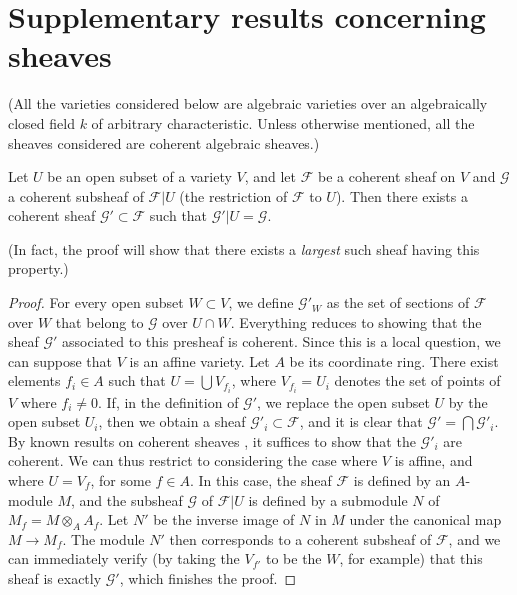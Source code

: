 \documentclass{article}
\theoremstyle{plain}
\newenvironment{proposition}[1]
    {\renewcommand\theinnerproposition{#1}\innerproposition}
    {\endinnerproposition}
\theoremstyle{definition}
\newcommand{\scr}[1]{{\mathscr{#1}}}
\newcommand{\oldpage}[1]{\marginpar{\footnotesize$\Big\vert$ \textit{p.~#1}}}
\begin{document}
\section{Supplementary results concerning sheaves}
\label{section1}

(All the varieties considered below are algebraic varieties over an algebraically closed field $k$ of arbitrary characteristic. Unless otherwise mentioned, all the sheaves considered are coherent algebraic sheaves.)

\begin{proposition}{1}
\label{proposition1}
\oldpage{98}
  Let $U$ be an open subset of a variety $V$, and let $\scr{F}$ be a coherent sheaf on $V$ and $\scr{G}$ a coherent subsheaf of $\scr{F}|U$ (the restriction of $\scr{F}$ to $U$).
  Then there exists a coherent sheaf $\scr{G}'\subset\scr{F}$ such that $\scr{G}'|U=\scr{G}$.
\end{proposition}

(In fact, the proof will show that there exists a \emph{largest} such sheaf having this property.)

\begin{proof}
  For every open subset $W\subset V$, we define $\scr{G}'_W$ as the set of sections of $\scr{F}$ over $W$ that belong to $\scr{G}$ over $U\cap W$.
  Everything reduces to showing that the sheaf $\scr{G}'$ associated to this presheaf is coherent.
  Since this is a local question, we can suppose that $V$ is an affine variety.
  Let $A$ be its coordinate ring.
  There exist elements $f_i\in A$ such that $U=\bigcup V_{f_i}$, where $V_{f_i}=U_i$ denotes the set of points of $V$ where $f_i\neq0$.
  If, in the definition of $\scr{G}'$, we replace the open subset $U$ by the open subset $U_i$, then we obtain a sheaf $\scr{G}'_i\subset\scr{F}$, and it is clear that $\scr{G}'=\bigcap\scr{G}'_i$.
  By known results on coherent sheaves \cite[p.~209]{12}, it suffices to show that the $\scr{G}'_i$ are coherent.
  We can thus restrict to considering the case where $V$ is affine, and where $U=V_f$, for some $f\in A$.
  In this case, the sheaf $\scr{F}$ is defined by an $A$-module $M$, and the subsheaf $\scr{G}$ of $\scr{F}|U$ is defined by a submodule $N$ of $M_f=M\otimes_A A_f$.
  Let $N'$ be the inverse image of $N$ in $M$ under the canonical map $M\to M_f$.
  The module $N'$ then corresponds to a coherent subsheaf of $\scr{F}$, and we can immediately verify (by taking the $V_{f'}$ to be the $W$, for example) that this sheaf is exactly $\scr{G}'$, which finishes the proof.
\end{proof}
\end{document}
